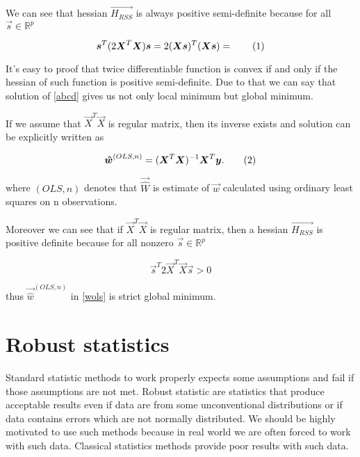 We can see that hessian $\vec{H_{RSS}}$ is always positive semi-definite because for all $\vec{s} \in \mathbb{R}^p$



\begin{equation}
    \vec{s}^T(2\vec{X}^T\vec{X})\vec{s} = 2(\vec{X}\vec{s})^T(\vec{X}\vec{s}) =  \numberthis
\end{equation}

It's easy to proof that twice differentiable function is convex if and only if the hessian of such function is positive semi-definite. Due to that we can say that solution of \eqref{abcd} gives us not only local minimum but global minimum. 

If we assume that $\vec{X}^T\vec{X}$ is regular matrix, then its inverse exists and solution can be explicitly written as


\begin{equation}
    \vec{\hat{w}}^{(OLS,n)} = (\vec{X}^T\vec{X})^{-1}\vec{X}^T\vec{y}. \numberthis \label{wols}
\end{equation}

where $(OLS,n)$ denotes that $\vec{\hat{W}}$ is estimate of $\vec{w}$ calculated using ordinary least squares on n observations. 

Moreover we can see that if $\vec{X}^T\vec{X}$ is regular matrix, then a hessian $\vec{H_{RSS}}$ is positive definite because for all nonzero $\vec{s} \in \mathbb{R}^p$


\begin{equation}
    \vec{s}^T 2\vec{X}^T\vec{X} \vec{s} > 0
\end{equation}

thus $\vec{\hat{w}}^{(OLS,n)}$ in \eqref{wols} is strict global minimum.




\section{Robust statistics}
Standard statistic methods to work properly expects some assumptions and fail if those assumptions are not met. Robust statistic are statistics that produce acceptable results even if data are from some unconventional distributions or if data contains errors which are not normally distributed. We should be highly motivated to use such methods because in real world we are often forced to work with such data. Classical statistics methods provide poor results with such data. 

